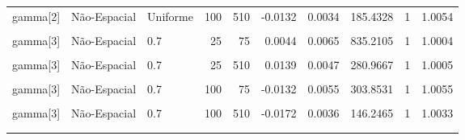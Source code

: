 \documentclass[
]{article}
\begin{document}
\begin{longtable}[t]{lllrrrrrrr}
\cmidrule{1-10}\pagebreak[0]
gamma[2] & Não-Espacial & Uniforme & 100 & 510 & -0.0132 & 0.0034 & 185.4328 & 1 & 1.0054\\
\cmidrule{1-10}\pagebreak[0]
\cellcolor{gray!10}{gamma[3]} & \cellcolor{gray!10}{Espacial} & \cellcolor{gray!10}{0.7} & \cellcolor{gray!10}{25} & \cellcolor{gray!10}{75} & \cellcolor{gray!10}{0.0910} & \cellcolor{gray!10}{0.0268} & \cellcolor{gray!10}{235.1287} & \cellcolor{gray!10}{1} & \cellcolor{gray!10}{1.0023}\\
\cmidrule{1-10}\pagebreak[0]
gamma[3] & Não-Espacial & 0.7 & 25 & 75 & 0.0044 & 0.0065 & 835.2105 & 1 & 1.0004\\
\cmidrule{1-10}\pagebreak[0]
\cellcolor{gray!10}{gamma[3]} & \cellcolor{gray!10}{Espacial} & \cellcolor{gray!10}{0.7} & \cellcolor{gray!10}{25} & \cellcolor{gray!10}{510} & \cellcolor{gray!10}{-0.0068} & \cellcolor{gray!10}{0.0047} & \cellcolor{gray!10}{96.5942} & \cellcolor{gray!10}{1} & \cellcolor{gray!10}{1.0743}\\
\cmidrule{1-10}\pagebreak[0]
gamma[3] & Não-Espacial & 0.7 & 25 & 510 & 0.0139 & 0.0047 & 280.9667 & 1 & 1.0005\\
\cmidrule{1-10}\pagebreak[0]
\cellcolor{gray!10}{gamma[3]} & \cellcolor{gray!10}{Espacial} & \cellcolor{gray!10}{0.7} & \cellcolor{gray!10}{100} & \cellcolor{gray!10}{75} & \cellcolor{gray!10}{0.0321} & \cellcolor{gray!10}{0.0128} & \cellcolor{gray!10}{167.2387} & \cellcolor{gray!10}{1} & \cellcolor{gray!10}{1.0828}\\
\cmidrule{1-10}\pagebreak[0]
gamma[3] & Não-Espacial & 0.7 & 100 & 75 & -0.0132 & 0.0055 & 303.8531 & 1 & 1.0055\\
\cmidrule{1-10}\pagebreak[0]
\cellcolor{gray!10}{gamma[3]} & \cellcolor{gray!10}{Espacial} & \cellcolor{gray!10}{0.7} & \cellcolor{gray!10}{100} & \cellcolor{gray!10}{510} & \cellcolor{gray!10}{-0.0220} & \cellcolor{gray!10}{0.0039} & \cellcolor{gray!10}{63.5637} & \cellcolor{gray!10}{1} & \cellcolor{gray!10}{1.0963}\\
\cmidrule{1-10}\pagebreak[0]
gamma[3] & Não-Espacial & 0.7 & 100 & 510 & -0.0172 & 0.0036 & 146.2465 & 1 & 1.0033\\
\cmidrule{1-10}\pagebreak[0]
\cellcolor{gray!10}{gamma[3]} & \cellcolor{gray!10}{Espacial} & \cellcolor{gray!10}{Uniforme} & \cellcolor{gray!10}{25} & \cellcolor{gray!10}{75} & \cellcolor{gray!10}{0.0736} & \cellcolor{gray!10}{0.0214} & \cellcolor{gray!10}{675.2819} & \cellcolor{gray!10}{1} & \cellcolor{gray!10}{1.0048}\\
\cmidrule{1-10}\pagebreak[0]

\end{longtable}
\end{document}
